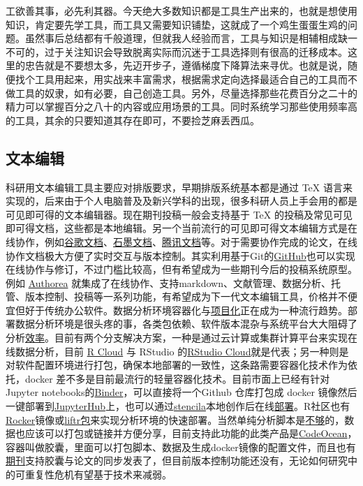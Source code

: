 \documentclass[]{tufte-book}
\begin{document}
工欲善其事，必先利其器。今天绝大多数知识都是工具生产出来的，也就是想使用知识，肯定要先学工具，而工具又需要知识铺垫，这就成了一个鸡生蛋蛋生鸡的问题。虽然事后总结都有千般道理，但就我人经验而言，工具与知识是相辅相成缺一不可的，过于关注知识会导致脱离实际而沉迷于工具选择则有很高的迁移成本。这里的忠告就是不要想太多，先迈开步子，遵循梯度下降算法来寻优。也就是说，随便找个工具用起来，用实战来丰富需求，根据需求定向选择最适合自己的工具而不做工具的奴隶，如有必要，自己创造工具。另外，尽量选择那些花费百分之二十的精力可以掌握百分之八十的内容或应用场景的工具。同时系统学习那些使用频率高的工具，其余的只要知道其存在即可，不要捡芝麻丢西瓜。

\hypertarget{ux6587ux672cux7f16ux8f91}{%
\subsection*{文本编辑}\label{ux6587ux672cux7f16ux8f91}}

科研用文本编辑工具主要应对排版要求，早期排版系统基本都是通过 TeX 语言来实现的，后来由于个人电脑普及及新兴学科的出现，很多科研人员上手会用的都是可见即可得的文本编辑器。现在期刊投稿一般会支持基于 TeX 的投稿及常见可见即可得文档，这些都是本地编辑。另一个当前流行的可见即可得文本编辑方式是在线协作，例如\href{https://docs.google.com/}{谷歌文档}、\href{https://shimo.im/}{石墨文档}、\href{https://docs.qq.com/}{腾讯文档}等。对于需要协作完成的论文，在线协作文档极大方便了实时交互与版本控制。其实利用基于Git的\href{https://github.com/}{GitHub}也可以实现在线协作与修订，不过门槛比较高，但有希望成为一些期刊今后的投稿系统原型。例如 \href{https://www.authorea.com}{Authorea} 就集成了在线协作、支持markdown、文献管理、数据分析、托管、版本控制、投稿等一系列功能，有希望成为下一代文本编辑工具，价格并不便宜但好于传统办公软件。数据分析环境容器化与\href{https://my.scinote.net/projects}{项目化}正在成为一种流行趋势。部署数据分析环境是很头疼的事，各类包依赖、软件版本混杂与系统平台大大阻碍了分析\href{https://www.nature.com/news/1-500-scientists-lift-the-lid-on-reproducibility-1.19970}{效率}。目前有两个分支解决方案，一种是通过云计算或集群计算平台来实现在线数据分析，目前 \href{https://rcloud.social/index.html}{R Cloud} 与 RStudio 的\href{https://rstudio.cloud}{RStudio Cloud}就是代表；另一种则是对软件配置环境进行打包，确保本地部署的一致性，这条路需要容器化技术作为依托，docker 差不多是目前最流行的轻量容器化技术。目前市面上已经有针对Jupyter notebooks的\href{https://mybinder.org/}{Binder}，可以直接将一个Github 仓库打包成 docker 镜像然后一键部署到\href{https://jupyterhub.readthedocs.io/en/latest/index.html}{JupyterHub}上，也可以通过\href{https://stenci.la/}{stencila}本地创作后在线\href{https://github.com/minrk/nbstencilaproxy}{部署}。R社区也有\href{https://www.rocker-project.org/}{Rocker}镜像或\href{https://cran.r-project.org/web/packages/liftr/vignettes/liftr-intro.html}{liftr包}来实现分析环境的快速部署。当然单纯分析脚本是\href{https://markwoodbridge.com/2017/03/05/jupyter-reproducible-science.html}{不够}的，数据也应该可以打包或链接并方便分享，目前支持此功能的此类产品是\href{https://codeocean.com}{CodeOcean}，容器叫做胶囊，里面可以打包脚本、数据及生成docker镜像的配置文件，而且也有\href{https://f1000research.com/articles/4-121/v1}{期刊}支持胶囊与论文的同步发表了，但目前版本控制功能还没有，无论如何研究中的可重复性危机有望基于技术来减弱。
\end{document}
